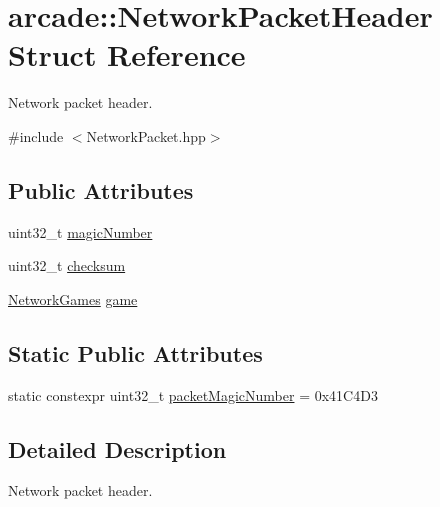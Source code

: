 \hypertarget{structarcade_1_1_network_packet_header}{\section{arcade\-:\-:Network\-Packet\-Header Struct Reference}
\label{structarcade_1_1_network_packet_header}
}


Network packet header.  




{\ttfamily \#include $<$Network\-Packet.\-hpp$>$}

\subsection*{Public Attributes}
\begin{DoxyCompactItemize}
\item 
uint32\-\_\-t \hyperlink{structarcade_1_1_network_packet_header_a4d6f47edd6e4596028680131f8575cae}{magic\-Number}
\item 
uint32\-\_\-t \hyperlink{structarcade_1_1_network_packet_header_a9ccebe960cf3f7461c2228c48ebe97a2}{checksum}
\item 
\hyperlink{namespacearcade_ac69775ea7f779dc95b0e7769f61ea6aa}{Network\-Games} \hyperlink{structarcade_1_1_network_packet_header_a640a3e1b6eb8c3580f535c593d852241}{game}
\end{DoxyCompactItemize}
\subsection*{Static Public Attributes}
\begin{DoxyCompactItemize}
\item 
static constexpr uint32\-\_\-t \hyperlink{structarcade_1_1_network_packet_header_a5abaf4eae1f868651c04f94c54b7338f}{packet\-Magic\-Number} = 0x41\-C4\-D3
\end{DoxyCompactItemize}


\subsection{Detailed Description}
Network packet header. 

